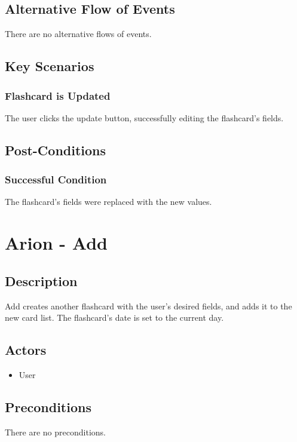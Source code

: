 \documentclass{scrreprt}
\begin{document}
\section{Alternative Flow of Events}
    There are no alternative flows of events.

\section{Key Scenarios}
    \subsection{Flashcard is Updated}
    The user clicks the update button, successfully editing the flashcard's fields.

\section{Post-Conditions}
    \subsection{Successful Condition}
    The flashcard's fields were replaced with the new values.
    

\chapter{Arion - Add}

\section{Description}
Add creates another flashcard with the user's desired fields, and adds it to
the new card list. The flashcard's date is set to the current day.

\section{Actors}
\begin{itemize}
    \item User
\end{itemize}

\section{Preconditions}
    There are no preconditions.
\end{document}

